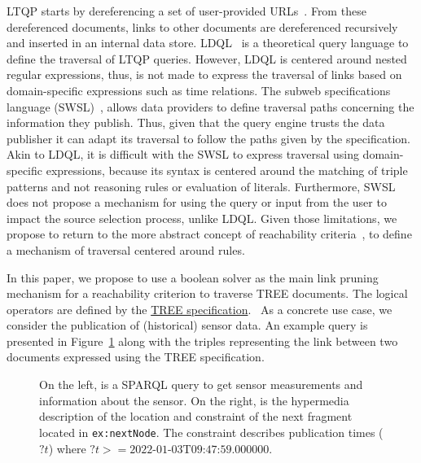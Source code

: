 LTQP starts by dereferencing a set of user-provided URLs~\cite{Hartig2016}.
From these dereferenced documents, links to other documents are dereferenced recursively and inserted in an internal data store.
LDQL~\cite{hartig2016Ldql} is a theoretical query language to define the traversal of LTQP queries.
However, LDQL is centered around nested regular expressions, thus, is not made to express the traversal of links based on domain-specific expressions
such as time relations.
The subweb specifications language (SWSL)~\cite{bogaerts_rulemlrr_2021}, allows data providers to define traversal paths concerning the information they publish.
Thus, given that the query engine trusts the data publisher it can adapt its traversal to follow the paths given by the specification.
Akin to LDQL, it is difficult with the SWSL to express traversal using domain-specific expressions, because its syntax is centered around the matching of triple patterns and not reasoning rules or evaluation of literals.
Furthermore, SWSL does not propose a mechanism for using the query or input from the user to impact the source selection process, unlike LDQL.
Given those limitations, we propose to return to the more abstract concept of reachability criteria~\cite{hartig2012},
to define a mechanism of traversal centered around rules.

In this paper, we propose to use a boolean solver as the main link pruning mechanism for a reachability criterion to traverse TREE documents.
The logical operators are defined by the \href{https://w3id.org/tree/specification/}{TREE specification}.~
As a concrete use case, we consider the publication of (historical) sensor data.
An example query is presented in Figure~\ref{lst:system} along with the triples representing the link between two documents expressed using the TREE specification.

\begin{figure}[h]
    \begin{minipage}{0.50\textwidth}
        \centering
        
    \end{minipage}
    \hspace{0.05\textwidth}
    \begin{minipage}{0.43\textwidth}
        \centering
        
    \end{minipage}
    \caption{On the left, is a SPARQL query to get sensor measurements and information about the sensor.
    On the right, is the hypermedia description of the location and constraint of the next fragment located in \texttt{ex:nextNode}.
    The constraint describes publication times ($?t$) where $?t>= \text{2022-01-03T09:47:59.000000}$.}
        \label{lst:system}
    \vspace*{-0.90cm}
\end{figure}
